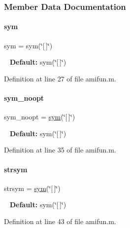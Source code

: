 \subsubsection{Member Data Documentation}
\mbox{\label{classamifun_a3c48fff3d28406486a4f1b5e18da7ca6}} 
\paragraph{\texorpdfstring{sym}{sym}}
{\footnotesize\ttfamily sym = sym(\char`\"{}\mbox{[}$\,$\mbox{]}\char`\"{})}

~\newline
{\bfseries Default\+:} sym(\char`\"{}\mbox{[}$\,$\mbox{]}\char`\"{}) 

Definition at line 27 of file amifun.\+m.

\mbox{\label{classamifun_a653c7ed7ae2eeb18b7cb2f0a6be8ab5b}} 
\paragraph{\texorpdfstring{sym\+\_\+noopt}{sym\_noopt}}
{\footnotesize\ttfamily sym\+\_\+noopt = \mbox{\hyperlink{classamifun_a3c48fff3d28406486a4f1b5e18da7ca6}{sym}}(\char`\"{}\mbox{[}$\,$\mbox{]}\char`\"{})}

~\newline
{\bfseries Default\+:} sym(\char`\"{}\mbox{[}$\,$\mbox{]}\char`\"{}) 

Definition at line 35 of file amifun.\+m.

\mbox{\label{classamifun_a4814315a739f43461b003c1c1ef6f550}} 
\paragraph{\texorpdfstring{strsym}{strsym}}
{\footnotesize\ttfamily strsym = \mbox{\hyperlink{classamifun_a3c48fff3d28406486a4f1b5e18da7ca6}{sym}}(\char`\"{}\mbox{[}$\,$\mbox{]}\char`\"{})}

~\newline
{\bfseries Default\+:} sym(\char`\"{}\mbox{[}$\,$\mbox{]}\char`\"{}) 

Definition at line 43 of file amifun.\+m.

